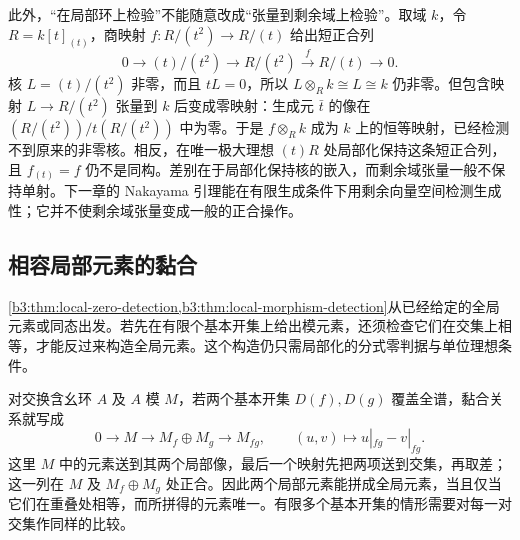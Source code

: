 \ProseParagraphBreak
此外，“在局部环上检验”不能随意改成“张量到剩余域上检验”。取域 \(k\)，令 \(R=k[t]_{(t)}\)，商映射 \(f:R/(t^2)\rightarrow R/(t)\) 给出短正合列
\[
	0\longrightarrow (t)/(t^2)\longrightarrow R/(t^2) \xrightarrow{f}R/(t)\longrightarrow0.
\]
核 \(L=(t)/(t^2)\) 非零，而且 \(tL=0\)，所以 \(L\otimes_Rk\cong L\cong k\) 仍非零。但包含映射 \(L\rightarrow R/(t^2)\) 张量到 \(k\) 后变成零映射：生成元 \(\bar t\) 的像在 \((R/(t^2))/t(R/(t^2))\) 中为零。于是 \(f\otimes_Rk\) 成为 \(k\) 上的恒等映射，已经检测不到原来的非零核。相反，在唯一极大理想 \((t)R\) 处局部化保持这条短正合列，且 \(f_{(t)}=f\) 仍不是同构。差别在于局部化保持核的嵌入，而剩余域张量一般不保持单射。下一章的 Nakayama 引理能在有限生成条件下用剩余向量空间检测生成性；它并不使剩余域张量变成一般的正合操作。

\subsection{相容局部元素的黏合}
\label{b3:subsec:0204:04}

\cref{b3:thm:local-zero-detection,b3:thm:local-morphism-detection}从已经给定的全局元素或同态出发。若先在有限个基本开集上给出模元素，还须检查它们在交集上相等，才能反过来构造全局元素。这个构造仍只需局部化的分式零判据与单位理想条件。

对交换含幺环 \(A\) 及 \(A\) 模 \(M\)，若两个基本开集 \(D(f),D(g)\) 覆盖全谱，黏合关系就写成
\[
	0\longrightarrow M\longrightarrow M_f\oplus M_g \longrightarrow M_{fg}, \qquad (u,v)\longmapsto u|_{fg}-v|_{fg}.
\]
这里 \(M\) 中的元素送到其两个局部像，最后一个映射先把两项送到交集，再取差；这一列在 \(M\) 及 \(M_f\oplus M_g\) 处正合。因此两个局部元素能拼成全局元素，当且仅当它们在重叠处相等，而所拼得的元素唯一。有限多个基本开集的情形需要对每一对交集作同样的比较。

